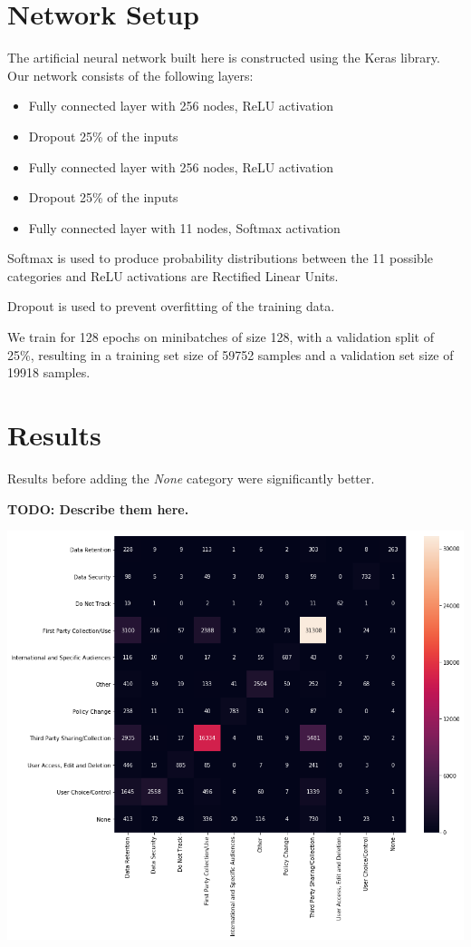 \documentclass[12pt, letterpaper]{article}
\begin{document}
\section{Network Setup}
The artificial neural network built here is constructed using the Keras library. Our network consists of the following layers:

\begin{itemize}
\item Fully connected layer with 256 nodes, ReLU activation
\item Dropout 25\% of the inputs
\item Fully connected layer with 256 nodes, ReLU activation
\item Dropout 25\% of the inputs
\item Fully connected layer with 11 nodes, Softmax activation
\end{itemize}

Softmax is used to produce probability distributions between the 11 possible categories and ReLU activations are Rectified Linear Units. 

Dropout is used to prevent overfitting of the training data.

We train for 128 epochs on minibatches of size 128, with a validation split of 25\%, resulting in a training set size of 59752 samples and a validation set size of 19918 samples.

\section{Results}
Results before adding the \textit{None} category were significantly better. 

\textbf{TODO: Describe them here.}

\includegraphics[width=\linewidth]{confusion-matrix}
\end{document}
